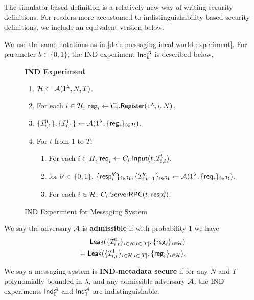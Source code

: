 The simulator based definition is a relatively new way of writing security definitions. For readers more accustomed to indistinguishability-based security definitions, we include an equivalent version below.
\begin{definition}
\label{defn:messaging-ind-experiment}
We use the same notations as in \cref{defn:messaging-ideal-world-experiment}. For parameter $b \in \{0, 1\}$, the IND experiment $\mathsf{Ind}_b^{\mathcal{A}}$ is described below, 
\begin{figure}[!h]
\begin{framed}
\textbf{IND Experiment}
\begin{enumerate}
\item $\mathcal{H} \leftarrow \mathcal{A}(1^{\lambda}, N, T)$.
\item For each $i \in \mathcal{H}$, $\mathsf{reg}_i \leftarrow C_i.\mathsf{Register}(1^{\lambda}, i, N)$. 
\item $\{\mathcal{I}^{0}_{i, 1}\}, \{\mathcal{I}^{1}_{i, 1}\} \leftarrow \mathcal{A}(1^{\lambda}, \{\mathsf{reg}_i\}_{i \in \mathcal{H}})$.
\item For $t$ from $1$ to $T$:
    \begin{enumerate}
    \item For each $i \in H$, $\mathsf{req}_i \leftarrow C_i.\mathsf{Input}(t, \mathcal{I}^{b}_{i, t})$.
    
    \item for $b'\in \{0, 1\}$, $\{\mathsf{resp}^{b'}_i\}_{i \in \mathcal{H}},\{\mathcal{I}^{b'}_{i, t + 1}\}_{i \in \mathcal{H}} \leftarrow \mathcal{A}(1^{\lambda}, \{\mathsf{req}_i\}_{i \in \mathcal{H}})$.
    
    \item For each $i \in \mathcal{H}$, $C_i.\mathsf{ServerRPC}(t, \mathsf{resp}^{b}_i)$.
    \end{enumerate}
\end{enumerate}
\end{framed}
\caption{IND Experiment for Messaging System}
\label{expr:messaging-IND}
\end{figure}

We say the adversary $\mathcal{A}$ is \textbf{admissible} if with probability $1$ we have
\begin{align*}
\mathsf{Leak}(\{\mathcal{I}^{0}_{i, t}\}_{i \in \mathcal{H}, t \in [T]}, \{\mathsf{reg}_i\}_{i \in \mathcal{H}}) \\
= \mathsf{Leak}(\{\mathcal{I}^{1}_{i, t}\}_{i \in \mathcal{H}, t \in [T]}, \{\mathsf{reg}_i\}_{i \in \mathcal{H}}).    
\end{align*}
\end{definition}
\begin{definition}
\label{defn:messaging-IND-security}
We say a messaging system is \textbf{IND-metadata secure} if for any $N$ and $T$ polynomially bounded in $\lambda$, and any admissible adversary $\mathcal{A}$, the IND experiments $\mathsf{Ind}_0^{\mathcal{A}}$ and $\mathsf{Ind}_1^{\mathcal{A}}$ are indistinguishable.
\end{definition}

